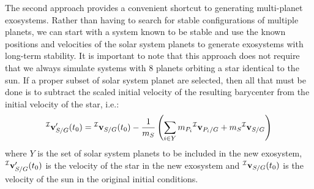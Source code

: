 The second approach provides a convenient shortcut to generating multi-planet exosystems.  Rather than having to search for stable configurations of multiple planets, we can start with a system known to be stable and use the known positions and velocities of the solar system planets to generate exosystems with long-term stability.  It is important to note that this approach does not require that we always simulate systems with 8 planets orbiting a star identical to the sun.  If a proper subset of solar system planet are selected, then all that must be done is to subtract the scaled initial velocity of the resulting barycenter from the initial velocity of the star, i.e.:
\begin{equation}
{}^\mathcal I \mathbf v'_{S/G} (t_0) = {}^\mathcal I \mathbf v_{S/G} (t_0) - \frac{1}{m_S}\left(\sum_{i \in Y} m_{P_i} {}^\mathcal I \mathbf v_{P_i/G} + m_S {}^\mathcal I \mathbf v_{S/G}\right)
\end{equation}
where $Y$ is the set of solar system planets to be included in the new exosystem, ${}^\mathcal I \mathbf v'_{S/G}(t_0)$ is the velocity of the star in the new exosystem and ${}^\mathcal I \mathbf v_{S/G}(t_0)$ is the velocity of the sun in the original initial conditions.

